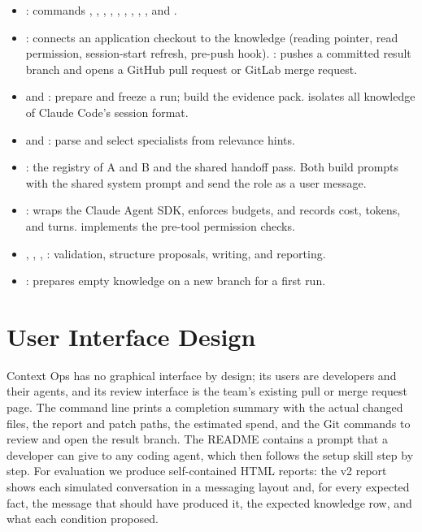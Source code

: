 \begin{sloppypar}\begin{itemize}[nosep]
  \item {}: commands , , , , , , , , , and .
  \item {}: connects an application checkout to the knowledge (reading pointer, read permission, session-start refresh, pre-push hook). : pushes a committed result branch and opens a GitHub pull request or GitLab merge request.
  \item {} and : prepare and freeze a run; build the evidence pack.  isolates all knowledge of Claude Code's session format.
  \item {} and : parse  and select specialists from relevance hints.
  \item {}: the registry of A and B and the shared handoff pass. Both build prompts with the shared system prompt and send the role as a user message.
  \item {}: wraps the Claude Agent SDK, enforces budgets, and records cost, tokens, and turns.  implements the pre-tool permission checks.
  \item {}, , , : validation, structure proposals, writing, and reporting.
  \item {}: prepares empty knowledge on a new branch for a first run.
\end{itemize}\end{sloppypar}

\section{User Interface Design}

Context Ops has no graphical interface by design; its users are developers and their agents, and its review interface is the team's existing pull or merge request page. The command line prints a completion summary with the actual changed files, the report and patch paths, the estimated spend, and the Git commands to review and open the result branch. The README contains a prompt that a developer can give to any coding agent, which then follows the setup skill step by step. For evaluation we produce self-contained HTML reports: the v2 report shows each simulated conversation in a messaging layout and, for every expected fact, the message that should have produced it, the expected knowledge row, and what each condition proposed.
